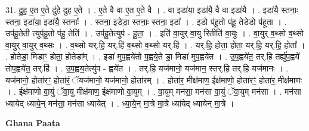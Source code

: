 \documentclass[17pt]{extarticle}
\begin{document}
31. दु॒ह॒ ए॒त ए॒ते दु॑हे दुह ए॒ते । . ए॒ते वै वा ए॒त ए॒ते वै । . वा इडा॑या॒ इडा॑यै॒ वै वा इडा॑यै । . इडा॑यै॒ स्तनाः॒ स्तना॒ इडा॑या॒ इडा॑यै॒ स्तनाः᳚ । . स्तना॒ इडेडा॒ स्तनाः॒ स्तना॒ इडा᳚ । . इडो प॑हू॒तो प॑हू॒ तेडेडो प॑हूता । . उप॑हू॒तेती त्युप॑हू॒तो प॑हू॒ तेति॑ । . उप॑हू॒तेत्युप॑ - हू॒ता॒ । . इति॑ वा॒युर् वा॒यु रितीति॑ वा॒युः । . वा॒युर् व॒थ्सो व॒थ्सो वा॒युर् वा॒युर् व॒थ्सः । . व॒थ्सो यर्.हि॒ यर्.हि॑ व॒थ्सो व॒थ्सो यर्.हि॑ । . यर्.हि॒ होता॒ होता॒ यर्.हि॒ यर्.हि॒ होता᳚ । . होतेडा॒ मिडाꣳ॒॒ होता॒ होतेडा᳚म् । . इडा॑ मुप॒ह्वये॑तो प॒ह्वये॒ते डा॒ मिडा॑ मुप॒ह्वये॑त । . उ॒प॒ह्वये॑त॒ तर्.हि॒ तर्ह्यु॑प॒ह्वये॑ तोप॒ह्वये॑त॒ तर्.हि॑ । . उ॒प॒ह्वय॒तेत्यु॑प - ह्वये॑त । . तर्.हि॒ यज॑मानो॒ यज॑मान॒ स्तर्.हि॒ तर्.हि॒ यज॑मानः । . यज॑मानो॒ होता॑रꣳ॒॒ होता॑रं॒ ॅयज॑मानो॒ यज॑मानो॒ होता॑रम् । . होता॑र॒ मीक्ष॑माण॒ ईक्ष॑माणो॒ होता॑रꣳ॒॒ होता॑र॒ मीक्ष॑माणः । . ईक्ष॑माणो वा॒युं ॅवा॒यु मीक्ष॑माण॒ ईक्ष॑माणो वा॒युम् । . वा॒युम् मन॑सा॒ मन॑सा वा॒युं ॅवा॒युम् मन॑सा । . मन॑सा ध्यायेद् ध्याये॒न् मन॑सा॒ मन॑सा ध्यायेत् । . ध्या॒ये॒न् मा॒त्रे मा॒त्रे ध्या॑येद् ध्यायेन् मा॒त्रे । \newline

\textbf{Ghana Paata } \newline
\end{document}
